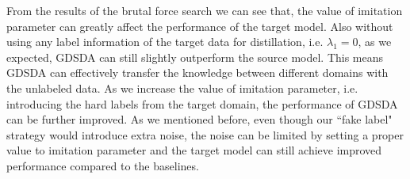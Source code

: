 From the results of the brutal force search we can see that, the value of imitation parameter can greatly affect the performance of the target model.
Also without using any label information of the target data for distillation, i.e. $\lambda_1 = 0$, as we expected, GDSDA can still slightly outperform the source model. This means GDSDA can effectively transfer the knowledge between different domains with the unlabeled data. As we increase the value of imitation parameter, i.e. introducing the hard labels from the target domain, the performance of GDSDA can be further improved. As we mentioned before, even though our ``fake label" strategy would introduce extra noise, the noise can be limited by setting a proper value to imitation parameter and the target model can still achieve improved performance compared to the baselines.

